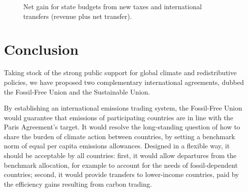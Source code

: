 \documentclass[12pt,english]{article}
\begin{document}
\begin{figure}[h!] 
  \caption{Net gain for state budgets from new taxes and international transfers (revenue plus net transfer).}\label{fig:budget_gain_both_taxes}
\end{figure}






\clearpage

\section*{Conclusion}

Taking stock of the strong public support for global climate and redistributive policies,\cite{fabre_international_2023} we have proposed two complementary international agreements, dubbed the Fossil-Free Union and the Sustainable Union. 

By establishing an international emissions trading system, the Fossil-Free Union would guarantee that emissions of participating countries are in line with the Paris Agreement's target. It would resolve the long-standing question of how to share the burden of climate action between countries, by setting a benchmark norm of equal per capita emissions allowances. Designed in a flexible way, it should be acceptable by all countries: first, it would allow departures from the benchmark allocation, for example to account for the needs of fossil-dependent countries; second, it would provide transfers to lower-income countries, paid by the efficiency gains resulting from carbon trading.
\end{document}
